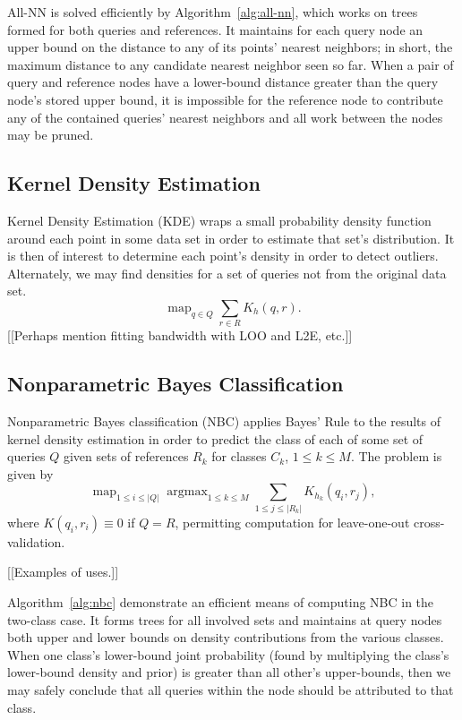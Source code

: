 \documentclass{article}
\DeclareMathOperator*{\argmax}{argmax}
\DeclareMathOperator*{\map}{map}
\begin{document}
All-NN is solved efficiently by Algorithm~\ref{alg:all-nn}, which
works on trees formed for both queries and references.  It maintains
for each query node an upper bound on the distance to any of its
points' nearest neighbors; in short, the maximum distance to any
candidate nearest neighbor seen so far.  When a pair of query and
reference nodes have a lower-bound distance greater than the query
node's stored upper bound, it is impossible for the reference node to
contribute any of the contained queries' nearest neighbors and all
work between the nodes may be pruned.

\subsection{Kernel Density Estimation}

Kernel Density Estimation (KDE) wraps a small probability density
function around each point in some data set in order to estimate that
set's distribution.  It is then of interest to determine each point's
density in order to detect outliers.  Alternately, we may find
densities for a set of queries not from the original data set.
\[
\map_{q \in Q} \sum_{r \in R} K_h(q,r).
\]
[[Perhaps mention fitting bandwidth with LOO and L2E, etc.]]

\subsection{Nonparametric Bayes Classification}

Nonparametric Bayes classification (NBC) applies Bayes' Rule to the
results of kernel density estimation in order to predict the class of
each of some set of queries $Q$ given sets of references $R_k$ for
classes $C_k$, $1 \leq k \leq M$.  The problem is given by
\[
\map_{1 \leq i \leq |Q|} \argmax_{1 \leq k \leq M} \sum_{1 \leq j \leq |R_k|} K_{h_k}(q_i,r_j),
\]
where $K(q_i,r_i) \equiv 0$ if $Q = R$, permitting computation for
leave-one-out cross-validation.

[[Examples of uses.]]

Algorithm~\ref{alg:nbc} demonstrate an efficient means of computing
NBC in the two-class case.  It forms trees for all involved sets and
maintains at query nodes both upper and lower bounds on density
contributions from the various classes.  When one class's lower-bound
joint probability (found by multiplying the class's lower-bound
density and prior) is greater than all other's upper-bounds, then we
may safely conclude that all queries within the node should be
attributed to that class.
\end{document}
